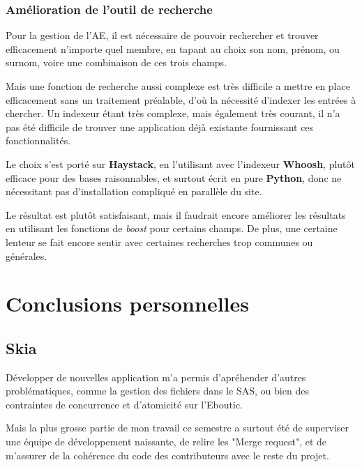 \documentclass[a4paper]{report}
\begin{document}
\subsection{Amélioration de l'outil de recherche}
\label{sub:amelioration_de_l_outil_de_recherche}
\par Pour la gestion de l'AE, il est nécessaire de pouvoir rechercher et trouver efficacement n'importe quel membre, en
tapant au choix son nom, prénom, ou surnom, voire une combinaison de ces trois champs.

\par Mais une fonction de recherche aussi complexe est très difficile a mettre en place efficacement sans un traitement
préalable, d'où la nécessité d'indexer les entrées à chercher. Un indexeur étant très complexe, mais également très
courant, il n'a pas été difficile de trouver une application déjà existante fournissant ces fonctionnalités.

\par Le choix s'est porté sur \textbf{Haystack}, en l'utilisant avec l'indexeur \textbf{Whoosh}, plutôt efficace pour
des bases raisonnables, et surtout écrit en pure \textbf{Python}, donc ne nécessitant pas d'installation compliqué en
parallèle du site.

\par Le résultat est plutôt satisfaisant, mais il faudrait encore améliorer les résultats en utilisant les fonctions de
\emph{boost} pour certains champs. De plus, une certaine lenteur se fait encore sentir avec certaines recherches trop
communes ou générales.


\chapter{Conclusions personnelles}
\section{Skia}
\label{sec:skia}
\par Développer de nouvelles application m'a permis d'apréhender d'autres problématiques, comme la gestion des fichiers
dans le SAS, ou bien des contraintes de concurrence et d'atomicité sur l'Eboutic.

\par Mais la plus grosse partie de mon travail ce semestre a surtout été de superviser une équipe de développement
naissante, de relire les "Merge request", et de m'assurer de la cohérence du code des contributeurs avec le reste du
projet.
\end{document}
